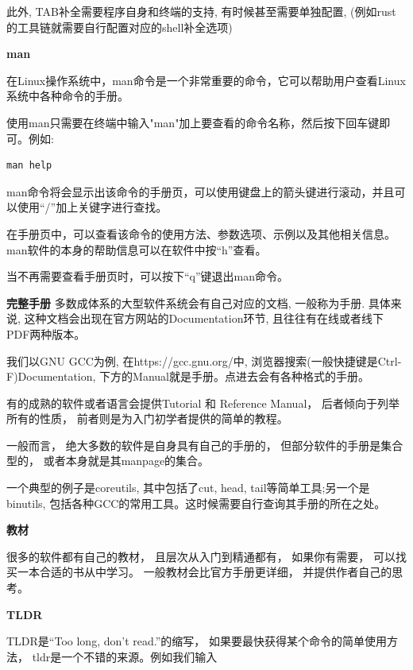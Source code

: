 此外, TAB补全需要程序自身和终端的支持, 有时候甚至需要单独配置, (例如rust的工具链就需要自行配置对应的shell补全选项)

\textbf{man}

在Linux操作系统中，man命令是一个非常重要的命令，它可以帮助用户查看Linux系统中各种命令的手册。

使用man只需要在终端中输入"man"加上要查看的命令名称，然后按下回车键即可。例如:

\begin{lstlisting}[language={Rust}, label={code:forktest},
	caption={forktest.rs}]
	man help
\end{lstlisting}

man命令将会显示出该命令的手册页，可以使用键盘上的箭头键进行滚动，并且可以使用“/”加上关键字进行查找。

在手册页中，可以查看该命令的使用方法、参数选项、示例以及其他相关信息。 man软件的本身的帮助信息可以在软件中按“h”查看。

当不再需要查看手册页时，可以按下“q”键退出man命令。

\textbf{完整手册}
多数成体系的大型软件系统会有自己对应的文档, 一般称为手册. 具体来说, 这种文档会出现在官方网站的Documentation环节, 且往往有在线或者线下PDF两种版本。

我们以GNU GCC为例, 在https://gcc.gnu.org/中, 浏览器搜索(一般快捷键是Ctrl-F)Documentation, 下方的Manual就是手册。点进去会有各种格式的手册。

有的成熟的软件或者语言会提供Tutorial 和 Reference Manual， 后者倾向于列举所有的性质， 前者则是为入门初学者提供的简单的教程。

一般而言， 绝大多数的软件是自身具有自己的手册的， 但部分软件的手册是集合型的， 或者本身就是其manpage的集合。

一个典型的例子是coreutils, 其中包括了cut, head, tail等简单工具;另一个是binutils, 包括各种GCC的常用工具。这时候需要自行查询其手册的所在之处。

\textbf{教材}

很多的软件都有自己的教材， 且层次从入门到精通都有， 如果你有需要， 可以找买一本合适的书从中学习。 一般教材会比官方手册更详细， 并提供作者自己的思考。

\textbf{TLDR}

TLDR是“Too long, don't read.”的缩写，
如果要最快获得某个命令的简单使用方法， tldr是一个不错的来源。例如我们输入

